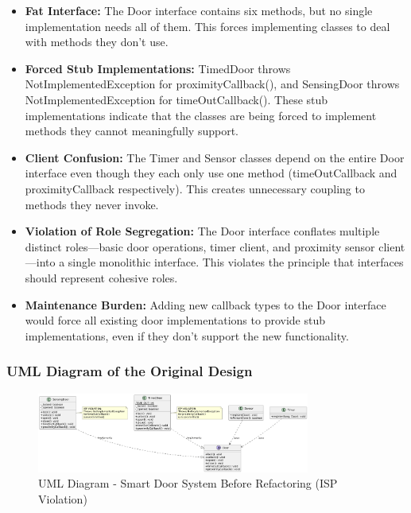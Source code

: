 \begin{itemize}
    \item \textbf{Fat Interface:} The Door interface contains six methods, but no single implementation needs all of them. This forces implementing classes to deal with methods they don't use.
    
    \item \textbf{Forced Stub Implementations:} TimedDoor throws NotImplementedException for proximityCallback(), and SensingDoor throws NotImplementedException for timeOutCallback(). These stub implementations indicate that the classes are being forced to implement methods they cannot meaningfully support.
    
    \item \textbf{Client Confusion:} The Timer and Sensor classes depend on the entire Door interface even though they each only use one method (timeOutCallback and proximityCallback respectively). This creates unnecessary coupling to methods they never invoke.
    
    \item \textbf{Violation of Role Segregation:} The Door interface conflates multiple distinct roles—basic door operations, timer client, and proximity sensor client—into a single monolithic interface. This violates the principle that interfaces should represent cohesive roles.
    
    \item \textbf{Maintenance Burden:} Adding new callback types to the Door interface would force all existing door implementations to provide stub implementations, even if they don't support the new functionality.
\end{itemize}

\subsubsection{UML Diagram of the Original Design}

\begin{figure}[H]
    \centering
    \includegraphics[width=0.8\textwidth]{ISP/plantUML/before.png}
    \caption{UML Diagram - Smart Door System Before Refactoring (ISP Violation)}
    \label{fig:isp_before}
\end{figure}

